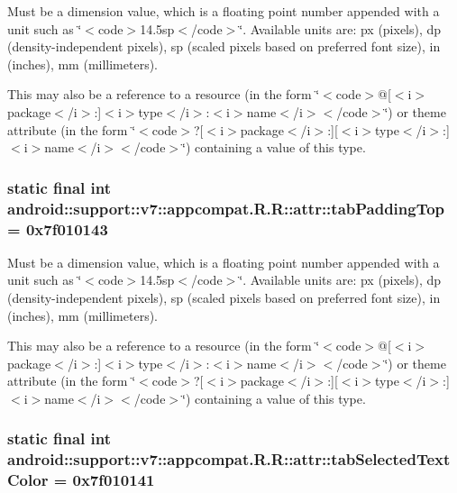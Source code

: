 Must be a dimension value, which is a floating point number appended with a unit such as \char`\"{}$<$code$>$14.5sp$<$/code$>$\char`\"{}. Available units are: px (pixels), dp (density-independent pixels), sp (scaled pixels based on preferred font size), in (inches), mm (millimeters). 

This may also be a reference to a resource (in the form \char`\"{}$<$code$>$@\mbox{[}$<$i$>$package$<$/i$>$:\mbox{]}$<$i$>$type$<$/i$>$:$<$i$>$name$<$/i$>$$<$/code$>$\char`\"{}) or theme attribute (in the form \char`\"{}$<$code$>$?\mbox{[}$<$i$>$package$<$/i$>$:\mbox{]}\mbox{[}$<$i$>$type$<$/i$>$:\mbox{]}$<$i$>$name$<$/i$>$$<$/code$>$\char`\"{}) containing a value of this type. \hypertarget{classandroid_1_1support_1_1v7_1_1appcompat_1_1_r_1_1attr_f02b828994c5f6e72dc58ec0d51cfc30}{
\subsubsection[{tabPaddingTop}]{\setlength{\rightskip}{0pt plus 5cm}static final int android::support::v7::appcompat.R.R::attr::tabPaddingTop = 0x7f010143}}
\label{classandroid_1_1support_1_1v7_1_1appcompat_1_1_r_1_1attr_f02b828994c5f6e72dc58ec0d51cfc30}


Must be a dimension value, which is a floating point number appended with a unit such as \char`\"{}$<$code$>$14.5sp$<$/code$>$\char`\"{}. Available units are: px (pixels), dp (density-independent pixels), sp (scaled pixels based on preferred font size), in (inches), mm (millimeters). 

This may also be a reference to a resource (in the form \char`\"{}$<$code$>$@\mbox{[}$<$i$>$package$<$/i$>$:\mbox{]}$<$i$>$type$<$/i$>$:$<$i$>$name$<$/i$>$$<$/code$>$\char`\"{}) or theme attribute (in the form \char`\"{}$<$code$>$?\mbox{[}$<$i$>$package$<$/i$>$:\mbox{]}\mbox{[}$<$i$>$type$<$/i$>$:\mbox{]}$<$i$>$name$<$/i$>$$<$/code$>$\char`\"{}) containing a value of this type. \hypertarget{classandroid_1_1support_1_1v7_1_1appcompat_1_1_r_1_1attr_59183241c2e3a42e3b3fbe575acb4157}{
\subsubsection[{tabSelectedTextColor}]{\setlength{\rightskip}{0pt plus 5cm}static final int android::support::v7::appcompat.R.R::attr::tabSelectedTextColor = 0x7f010141}}
\label{classandroid_1_1support_1_1v7_1_1appcompat_1_1_r_1_1attr_59183241c2e3a42e3b3fbe575acb4157}


